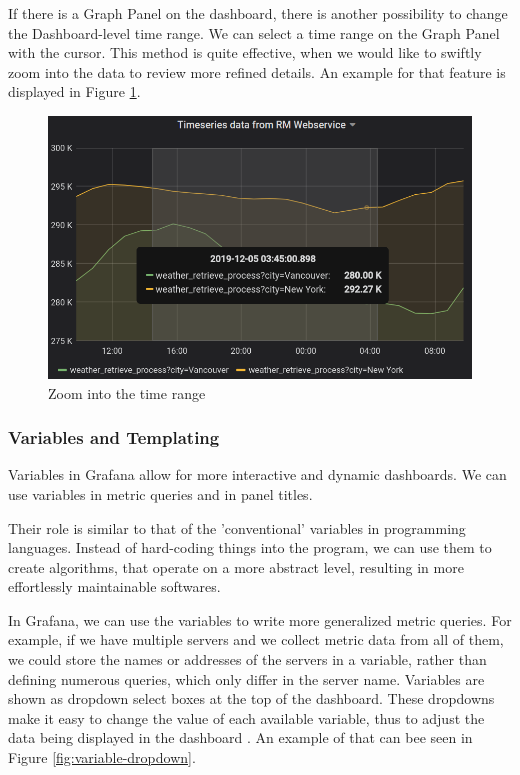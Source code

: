 If there is a Graph Panel on the dashboard, there is another possibility to change the Dashboard-level time range. We can select a time range on the Graph Panel with the cursor. This method is quite effective, when we would like to swiftly zoom into the data to review more refined details. An example for that feature is displayed in Figure \ref{fig:select-time}.

\begin{figure}[h]
	\centering
	\includegraphics[width=130mm, keepaspectratio]{figures/select-time.png}
	\caption{Zoom into the time range}
	\label{fig:select-time}
\end{figure}

\subsubsection{Variables and Templating}

Variables in Grafana allow for more interactive and dynamic dashboards. We can use variables in metric queries and in panel titles.

Their role is similar to that of the 'conventional' variables in programming languages. Instead of hard-coding things into the program, we can use them to create algorithms, that operate on a more abstract level, resulting in more effortlessly maintainable softwares.

In Grafana, we can use the variables to write more generalized metric queries. For example, if we have multiple servers and we collect metric data from all of them, we could store the names or addresses of the servers in a variable, rather than defining numerous queries, which only differ in the server name. Variables are shown as dropdown select boxes at the top of the dashboard. These dropdowns make it easy to change the value of each available variable, thus to adjust the data being displayed in the dashboard \cite{grafana-variables}. An example of that can bee seen in Figure \ref{fig:variable-dropdown}.

